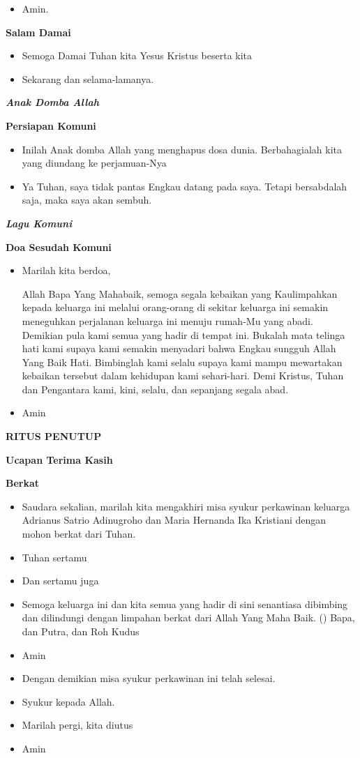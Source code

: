 \documentclass[a5paper,headsepline,titlepage,10pt]{scrbook}
\makeatletter
\newcommand{\judul}[1]{%
  {\parindent \z@ \centering \normalfont
    \interlinepenalty\@M \Large \bfseries #1\par\nobreak \vskip 20\p@ }}
\newcommand{\subjudul}[1]{%
  {\parindent \z@ \normalfont
    \interlinepenalty\@M \bfseries #1\par\nobreak \vskip 20\p@ }}
\newcommand{\lagu}[1]{%
  {\parindent \z@ \normalfont
    \interlinepenalty\@M \bfseries \emph{#1}\par\nobreak \vskip 20\p@ }}
\newcommand{\BU}[1]{\begin{itemize} \item[U:] #1 \end{itemize}}
\newcommand{\BI}[1]{\begin{itemize} \item[I:] #1 \end{itemize}}
\newcommand{\suami}{Adrianus Satrio Adinugroho }
\newcommand{\istri}{Maria Hernanda Ika Kristiani }
\makeatother
\begin{document}
\BU{Amin.}

\subjudul{Salam Damai}

\BI{Semoga Damai Tuhan kita Yesus Kristus beserta kita}

\BU{Sekarang dan selama-lamanya.}

\lagu{Anak Domba Allah}

\subjudul{Persiapan Komuni}

\BI{Inilah Anak domba Allah yang menghapus dosa dunia. Berbahagialah kita yang diundang ke perjamuan-Nya}
\BU{Ya Tuhan, saya tidak pantas Engkau datang pada saya. Tetapi bersabdalah saja, maka saya akan sembuh.}

\lagu{Lagu Komuni}

\subjudul{Doa Sesudah Komuni}

\BI{Marilah kita berdoa,

Allah Bapa Yang Mahabaik, semoga segala kebaikan yang Kaulimpahkan kepada keluarga ini melalui orang-orang di sekitar keluarga ini semakin meneguhkan perjalanan keluarga ini menuju rumah-Mu yang abadi. Demikian pula kami semua yang hadir di tempat ini. Bukalah mata telinga hati kami supaya kami semakin menyadari bahwa Engkau sungguh Allah Yang Baik Hati. Bimbinglah kami selalu supaya kami mampu mewartakan kebaikan tersebut dalam kehidupan kami sehari-hari. Demi Kristus, Tuhan dan Pengantara kami, kini, selalu, dan sepanjang segala abad.}

\BU{Amin}

\judul{RITUS PENUTUP}

\subjudul{Ucapan Terima Kasih}

\subjudul{Berkat}

\BI{Saudara sekalian, marilah kita mengakhiri misa syukur perkawinan keluarga \suami dan \istri dengan mohon berkat dari Tuhan.}
\BI{Tuhan sertamu}
\BU{Dan sertamu juga}
\BI{Semoga keluarga ini dan kita semua yang hadir di sini senantiasa dibimbing dan dilindungi dengan limpahan berkat dari Allah Yang Maha Baik. (\Cross) Bapa, dan Putra, dan Roh Kudus}
\BU{Amin}
\BI{Dengan demikian misa syukur perkawinan ini telah selesai.}
\BU{Syukur kepada Allah.}
\BI{Marilah pergi, kita diutus}
\BU{Amin}
\end{document}
